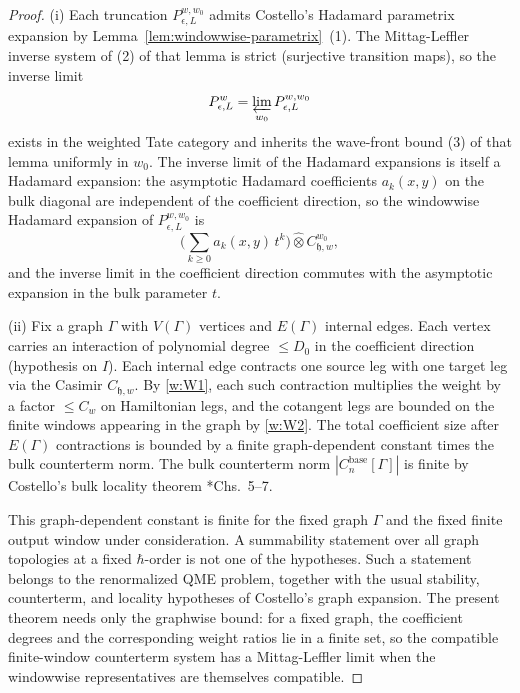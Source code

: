 \begin{proof}
  (i) Each truncation $P_{\epsilon,L}^{w,w_0}$ admits Costello's
  Hadamard parametrix expansion by
  Lemma~\ref{lem:windowwise-parametrix}~(1). The Mittag-Leffler
  inverse system of (2) of that lemma is strict (surjective
  transition maps), so the inverse limit
  \[
    P_{\epsilon,L}^{w}
      =\varprojlim_{w_0}P_{\epsilon,L}^{w,w_0}
  \]
  exists in the weighted Tate category and inherits the wave-front
  bound (3) of that lemma uniformly in $w_0$. The inverse limit of the
  Hadamard expansions is itself a Hadamard expansion: the
  asymptotic Hadamard coefficients $a_k(x,y)$ on the bulk diagonal
  are independent of the coefficient direction, so the windowwise
  Hadamard expansion of $P_{\epsilon,L}^{w,w_0}$ is
  \[
    \bigl(\sum_{k\geq0}a_k(x,y)\,t^k\bigr)\widehat\otimes
      C_{\mathfrak h,w}^{w_0},
  \]
  and the inverse limit in the
  coefficient direction commutes with the asymptotic expansion in
  the bulk parameter $t$.

  (ii) Fix a graph $\Gamma$ with $V(\Gamma)$ vertices and
  $E(\Gamma)$ internal edges. Each vertex carries an interaction of
  polynomial degree $\leq D_0$ in the coefficient direction
  (hypothesis on $I$). Each internal edge contracts one source leg
  with one target leg via the Casimir $C_{\mathfrak h,w}$. By
  \ref{w:W1}, each such contraction multiplies the weight by a factor
  $\leq C_w$ on Hamiltonian legs, and the cotangent legs are bounded
  on the finite windows appearing in the graph by
  \ref{w:W2}. The total coefficient size after $E(\Gamma)$
  contractions is bounded by a finite graph-dependent constant times
  the bulk counterterm norm. The
  bulk counterterm norm $|C_n^{\mathrm{base}}[\Gamma]|$ is finite by
  Costello's bulk locality theorem
  \cite{costello-renormalization}*{Chs.~5--7}.

  This graph-dependent constant is finite for the fixed graph
  \(\Gamma\) and the fixed finite output window under consideration.
  A summability statement over all graph topologies at a fixed
  \(\hbar\)-order is not one of the hypotheses.  Such a statement belongs
  to the renormalized QME problem, together with the usual stability,
  counterterm, and locality hypotheses of Costello's graph expansion.
  The present theorem needs only the graphwise bound: for a fixed
  graph, the coefficient degrees and the corresponding weight ratios
  lie in a finite set, so the compatible finite-window counterterm
  system has a Mittag-Leffler limit when the windowwise representatives
  are themselves compatible.


\end{proof}
